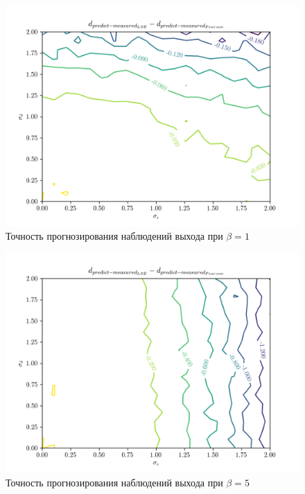 \begin{figure}[h]
  \centering
  \includegraphics[width=150mm]{fig/linear/predict/beta-1_predict-measured.png}
  \caption{Точность прогнозирования наблюдений выхода при \( \beta = 1\)}
\end{figure}

\begin{figure}[h]
  \centering
  \includegraphics[width=150mm]{fig/linear/predict/beta-5_predict-measured.png}
  \caption{Точность прогнозирования наблюдений выхода при \( \beta = 5 \)}
\end{figure}
